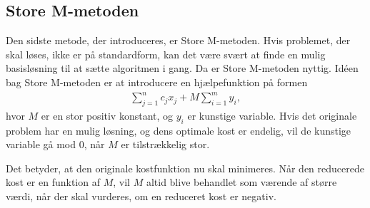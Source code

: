 \subsection{Store M-metoden}

Den sidste metode, der introduceres, er Store M-metoden. 
Hvis problemet, der skal løses, ikke er på standardform, kan det være svært at finde en mulig basisløsning til at sætte algoritmen i gang. Da er Store M-metoden nyttig.
Idéen bag Store M-metoden er at introducere en hjælpefunktion på formen
\begin{align*}
\sum\limits_{j=1}^n c_jx_j + M \sum\limits_{i=1}^m y_i,
\end{align*}
hvor $M$ er en stor positiv konstant, og $y_i$ er kunstige variable. 
Hvis det originale problem har en mulig løsning, og dens optimale kost er endelig, vil de kunstige variable gå mod $0$, når $M$ er tilstrækkelig stor. 

Det betyder, at den originale kostfunktion nu skal minimeres. 
Når den reducerede kost er en funktion af $M$, vil $M$ altid blive behandlet som værende af større værdi, når der skal vurderes, om en reduceret kost er negativ. \\

